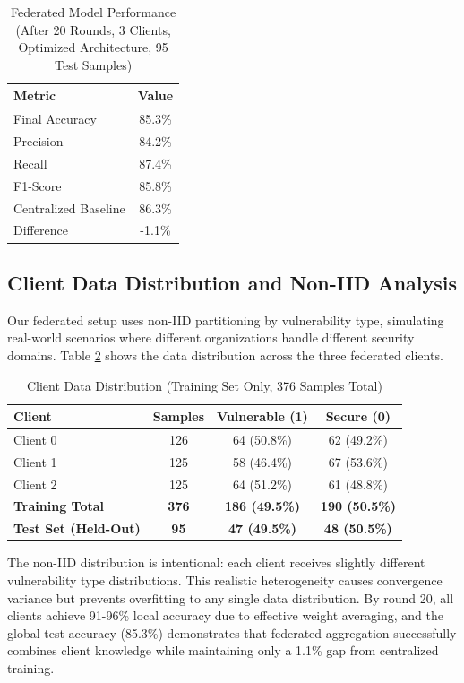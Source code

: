 \documentclass[conference]{IEEEtran}
\begin{document}
\begin{table}[h]
\centering
\caption{Federated Model Performance (After 20 Rounds, 3 Clients, Optimized Architecture, 95 Test Samples)}
\label{tab:federated}
\begin{tabular}{@{}lc@{}}
\toprule
\textbf{Metric} & \textbf{Value} \\ \midrule
Final Accuracy & 85.3\% \\
Precision & 84.2\% \\
Recall & 87.4\% \\
F1-Score & 85.8\% \\
Centralized Baseline & 86.3\% \\
Difference & -1.1\% \\ \bottomrule
\end{tabular}
\end{table}

\subsection{Client Data Distribution and Non-IID Analysis}

Our federated setup uses non-IID partitioning by vulnerability type, simulating real-world scenarios where different organizations handle different security domains. Table \ref{tab:noniid} shows the data distribution across the three federated clients.

\begin{table}[h]
\centering
\caption{Client Data Distribution (Training Set Only, 376 Samples Total)}
\label{tab:noniid}
\begin{tabular}{@{}lccc@{}}
\toprule
\textbf{Client} & \textbf{Samples} & \textbf{Vulnerable (1)} & \textbf{Secure (0)} \\ \midrule
Client 0 & 126 & 64 (50.8\%) & 62 (49.2\%) \\
Client 1 & 125 & 58 (46.4\%) & 67 (53.6\%) \\
Client 2 & 125 & 64 (51.2\%) & 61 (48.8\%) \\
\textbf{Training Total} & \textbf{376} & \textbf{186 (49.5\%)} & \textbf{190 (50.5\%)} \\
\textbf{Test Set (Held-Out)} & \textbf{95} & \textbf{47 (49.5\%)} & \textbf{48 (50.5\%)} \\ \bottomrule
\end{tabular}
\end{table}

The non-IID distribution is intentional: each client receives slightly different vulnerability type distributions. This realistic heterogeneity causes convergence variance but prevents overfitting to any single data distribution. By round 20, all clients achieve 91-96\% local accuracy due to effective weight averaging, and the global test accuracy (85.3\%) demonstrates that federated aggregation successfully combines client knowledge while maintaining only a 1.1\% gap from centralized training.
\end{document}
